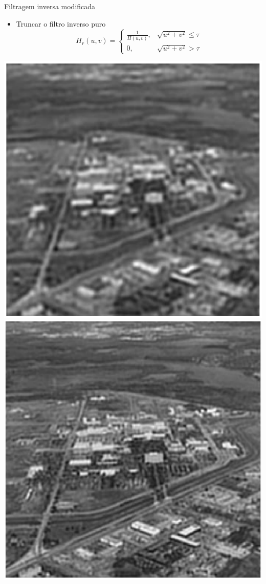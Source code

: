 \begin{slide}{Filtragem inversa modificada}
	\begin{itemize}
		\item Truncar o filtro inverso puro
			\begin{equation*}
				H_r(u,v) = \begin{cases} \frac{1}{H(u,v)}, & \sqrt{u^2+v^2}\leq \tau\\
				0, & \sqrt{u^2+v^2}>\tau \end{cases}
			\end{equation*}
	\end{itemize}
		\begin{center}
			\includegraphics[height = 0.35\textheight]{figs/5-27b}
			\includegraphics[height = 0.35\textheight]{figs/5-27c}

\end{center}
\end{slide}
